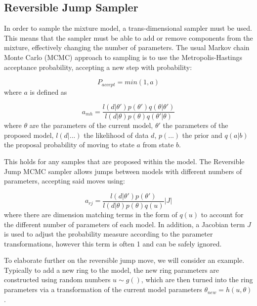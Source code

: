 \documentclass[11pt]{article} %
\begin{document}
\subsection{Reversible Jump Sampler}
In order to sample the mixture model, a trans-dimensional sampler must be used. This means that the sampler must be able to add or remove components from the mixture, effectively changing the number of parameters. 
The usual Markov chain Monte Carlo (MCMC) approach to sampling is to use the Metropolis-Hastings acceptance probability, accepting a new step with probability:

\begin{equation}
P_{accept} = min(1,a)
\end{equation}
where $a$ is defined as

\begin{equation}
a_{mh} = \frac{l(d|\theta')p(\theta')q(\theta|\theta')}{ l(d|\theta)p(\theta)q(\theta'|\theta)}
\end{equation}
where $\theta$ are the parameters of the current model, $\theta'$ the parameters of the proposed model, $l(d|...)$ the likelihood of data $d$, $p(...)$ the prior and $q(a|b)$ the proposal probability of moving to state $a$ from state $b$.

This holds for any samples that are proposed within the model. The Reversible Jump MCMC sampler allows jumps between models with different numbers of parameters, accepting said moves using:

\begin{equation}
a_{rj} = \frac{l(d|\theta')p(\theta')}{l(d|\theta)p(\theta)q(u)}|J|
\end{equation}
where there are dimension matching terms in the form of $q(u)$ to account for the different number of parameters of each model. In addition, a Jacobian term $J$ is used to adjust the probability measure according to the parameter transformations, however this term is often 1 and can be safely ignored.

To elaborate further on the reversible jump move, we will consider an example. Typically to add a new ring to the model, the new ring parameters are constructed using random numbers $u\sim g()$, which are then turned into the ring parameters via a transformation of the current model parameters $\theta_{new} = h(u,\theta)$.

{}

\end{document}
